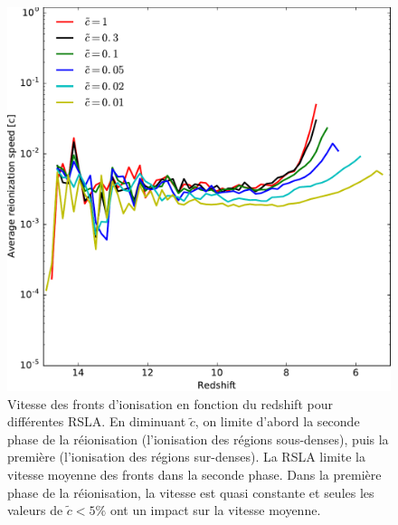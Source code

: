\begin{figure}
\centering
		\includegraphics[width=.9\linewidth]{img/04_mapreio/avg_reionization_speed.pdf} 
        \caption[Évolution de la vitesse moyenne des fronts]{Vitesse des fronts d'ionisation en fonction du redshift pour différentes \ac{RSLA}.
        En diminuant $\tilde{c}$, on limite d'abord la seconde phase de la réionisation (l'ionisation des régions sous-denses), puis la première (l'ionisation des régions sur-denses).
        La \ac{RSLA} limite la vitesse moyenne des fronts dans la seconde phase.
        Dans la première phase de la réionisation, la vitesse est quasi constante et seules les valeurs de $\tilde{c} < 5\% $ ont un impact sur la vitesse moyenne.
        }        
 		\label{fig:vreioz_avg}
\end{figure}



